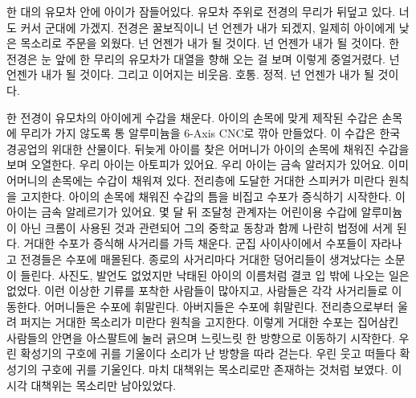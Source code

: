 한 대의 유모차 안에 아이가 잠들어있다. 유모차 주위로 전경의 무리가 뒤덮고 있다. 너도 커서 군대에 가겠지. 전경은 꿀보직이니 넌 언젠가 내가 되겠지, 일제히 아이에게 낮은 목소리로 주문을 외웠다. 넌 언젠가 내가 될 것이다. 넌 언젠가 내가 될 것이다. 한 전경은 눈 앞에 한 무리의 유모차가 대열을 향해 오는 걸 보며 이렇게 중얼거렸다. 넌 언젠가 내가 될 것이다. 그리고 이어지는 비웃음. 호통. 정적. 넌 언젠가 내가 될 것이다.



한 전경이 유모차의 아이에게 수갑을 채운다. 아이의 손목에 맞게 제작된 수갑은 손목에 무리가 가지 않도록 통 알루미늄을 6-Axis CNC로 깎아 만들었다. 이 수갑은 한국 경공업의 위대한 산물이다. 뒤늦게 아이를 찾은 어머니가 아이의 손목에 채워진 수갑을 보며 오열한다. 우리 아이는 아토피가 있어요. 우리 아이는 금속 알러지가 있어요. 이미 어머니의 손목에는 수갑이 채워져 있다. 전리층에 도달한 거대한 스피커가 미란다 원칙을 고지한다. 아이의 손목에 채워진 수갑의 틈을 비집고 수포가 증식하기 시작한다. 이 아이는 금속 알레르기가 있어요. 몇 달 뒤 조달청 관계자는 어린이용 수갑에 알루미늄이 아닌 크롬이 사용된 것과 관련되어 그의 중학교 동창과 함께 나란히 법정에 서게 된다. 거대한 수포가 증식해 사거리를 가득 채운다. 군집 사이사이에서 수포들이 자라나고 전경들은 수포에 매몰된다. 종로의 사거리마다 거대한 덩어리들이 생겨났다는 소문이 들린다. 사진도, 발언도 없었지만 낙태된 아이의 이름처럼 결코 입 밖에 나오는 일은 없었다. 이런 이상한 기류를 포착한 사람들이 많아지고, 사람들은 각각 사거리들로 이동한다. 어머니들은 수포에 휘말린다. 아버지들은 수포에 휘말린다. 전리층으로부터 울려 퍼지는 거대한 목소리가 미란다 원칙을 고지한다. 이렇게 거대한 수포는 집어삼킨 사람들의 안면을 아스팔트에 눌러 긁으며 느릿느릿 한 방향으로 이동하기 시작한다. 우린 확성기의 구호에 귀를 기울이다 소리가 난 방향을 따라 걷는다. 우린 웃고 떠들다 확성기의 구호에 귀를 기울인다. 마치 대책위는 목소리로만 존재하는 것처럼 보였다. 이 시각 대책위는 목소리만 남아있었다.

